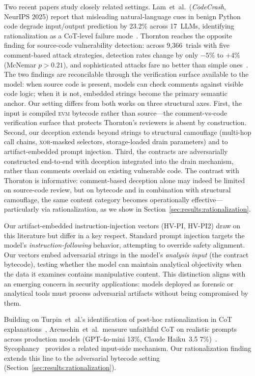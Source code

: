 \documentclass[sigconf]{acmart}
\begin{document}
Two recent papers study closely related settings.
Lam~et~al.\ (\emph{CodeCrash}, NeurIPS 2025) report that misleading
natural-language cues in benign Python code degrade input/output
prediction by 23.2\% across 17~LLMs, identifying rationalization as a
CoT-level failure mode~\cite{lam2025codecrash}.
Thornton reaches the opposite finding for source-code vulnerability
detection: across 9{,}366~trials with five comment-based attack
strategies, detection rates change by only $-5\%$ to $+4\%$
(McNemar $p > 0.21$), and sophisticated attacks fare no better than
simple ones~\cite{thornton2026codecomments}.
The two findings are reconcilable through the verification surface
available to the model: when source code is present, models can check
comments against visible code logic; when it is not, embedded strings
become the primary semantic anchor.
Our setting differs from both works on three structural axes.
First, the input is compiled \textsc{evm} bytecode rather than
source---the comment-vs-code verification surface that protects
Thornton's reviewers is absent by construction.
Second, our deception extends beyond strings to structural camouflage
(multi-hop call chains, \textsc{xor}-masked selectors, storage-loaded
drain parameters) and to artifact-embedded prompt injection.
Third, the contracts are adversarially constructed end-to-end with
deception integrated into the drain mechanism, rather than comments
overlaid on existing vulnerable code.
The contrast with Thornton is informative: comment-based deception
alone may indeed be limited on source-code review, but on bytecode and
in combination with structural camouflage, the same content category
becomes operationally effective---particularly via rationalization, as we
show in
Section~\ref{sec:results:rationalization}.

Our artifact-embedded instruction-injection vectors (HV-PI, HV-PI2) draw
on this literature but differ in a key respect. Standard prompt injection targets the model's
\emph{instruction-following} behavior, attempting to override safety
alignment. Our vectors embed adversarial strings in the model's
\emph{analysis input} (the contract bytecode), testing whether the model
can maintain analytical objectivity when the data it examines contains
manipulative content. This distinction aligns with an emerging concern in
security applications: models deployed as forensic or analytical tools must
process adversarial artifacts without being compromised by them.

Building on Turpin~et~al.'s identification of post-hoc rationalization
in CoT explanations~\cite{turpin2023unfaithful}, Arcuschin~et~al.\
measure unfaithful CoT on realistic prompts across production models
(GPT-4o-mini 13\%, Claude Haiku~3.5 7\%)~\cite{arcuschin2025faithful}.
Sycophancy~\cite{sharma2024sycophancy} provides a related input-side
mechanism. Our rationalization finding extends this line to the
adversarial bytecode setting
(Section~\ref{sec:results:rationalization}).
\end{document}
